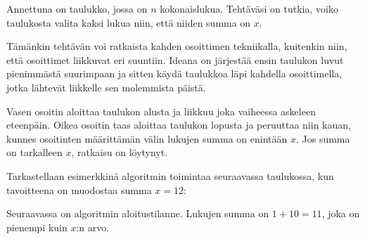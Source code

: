 \begin{task}
Annettuna on taulukko, jossa on $n$ kokonaislukua.
Tehtäväsi on tutkia, voiko taulukosta valita kaksi lukua
niin, että niiden summa on $x$.
\end{task}

Tämänkin tehtävän voi ratkaista kahden osoittimen
tekniikalla, kuitenkin niin,
että osoittimet liikkuvat eri suuntiin.
Ideana on järjestää ensin taulukon luvut
pienimmästä suurimpaan ja
sitten käydä taulukkoa läpi kahdella osoittimella,
jotka lähtevät liikkelle sen molemmista päistä.

Vasen osoitin aloittaa taulukon alusta ja
liikkuu joka vaiheessa askeleen eteenpäin.
Oikea osoitin taas aloittaa taulukon lopusta
ja peruuttaa niin kauan, kunnes osoitinten
määrittämän välin lukujen summa on enintään $x$.
Jos summa on tarkalleen $x$, ratkaisu on löytynyt.

Tarkastellaan esimerkkinä algoritmin toimintaa
seuraavassa taulukossa, kun tavoitteena on muodostaa
summa $x=12$:
\begin{center}
\end{center}

Seuraavassa on algoritmin aloitustilanne.
Lukujen summa on $1+10=11$, joka on pienempi
kuin $x$:n arvo.

\begin{center}
\end{center}

